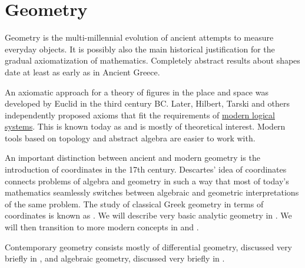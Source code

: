 \section{Geometry}\label{sec:geometry}

Geometry is the multi-millennial evolution of ancient attempts to measure everyday objects. It is possibly also the main historical justification for the gradual axiomatization of mathematics. Completely abstract results about shapes date at least as early as in Ancient Greece.

An axiomatic approach for a theory of figures in the place and space was developed by Euclid in the third century BC. Later, Hilbert, Tarski and others independently proposed axioms that fit the requirements of \hyperref[sec:mathematical_logic]{modern logical systems}. This is known today as  and is mostly of theoretical interest. Modern tools based on topology and abstract algebra are easier to work with.

An important distinction between ancient and modern geometry is the introduction of coordinates in the 17th century. Descartes' idea of coordinates connects problems of algebra and geometry in such a way that most of today's mathematics seamlessly switches between algebraic and geometric interpretations of the same problem. The study of classical Greek geometry in terms of coordinates is known as . We will describe very basic analytic geometry in . We will then transition to more modern concepts in  and .

Contemporary geometry consists mostly of differential geometry, discussed very briefly in , and algebraic geometry, discussed very briefly in .
